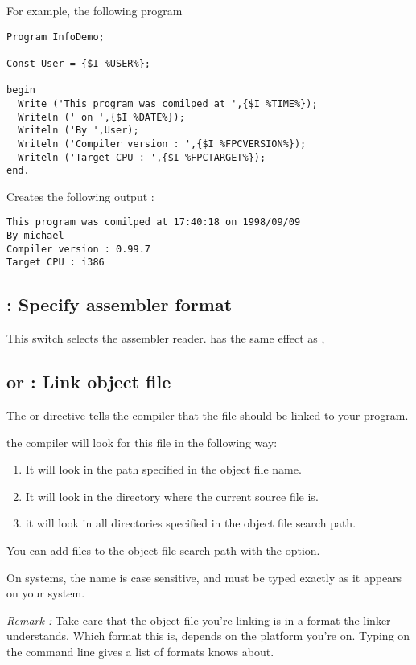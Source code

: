 \documentclass{report}
\begin{document}
For example, the following program
\begin{verbatim}
Program InfoDemo;

Const User = {$I %USER%};
       
begin
  Write ('This program was comilped at ',{$I %TIME%});
  Writeln (' on ',{$I %DATE%});
  Writeln ('By ',User);
  Writeln ('Compiler version : ',{$I %FPCVERSION%});
  Writeln ('Target CPU : ',{$I %FPCTARGET%});
end.
\end{verbatim} 
Creates the following output :
\begin{verbatim}
This program was comilped at 17:40:18 on 1998/09/09
By michael
Compiler version : 0.99.7
Target CPU : i386
\end{verbatim}
\subsection{ : Specify assembler format}

This switch selects the assembler reader. 
has the same effect as , 

\subsection{ or  : Link object file}
The  or  directive 
tells the compiler that the file  should be linked to 
your program. 

the compiler will look for this file in the following way:

\begin{enumerate}
\item It will look in the path specified in the object file name. 
\item It will look in the directory where the current source file is.
\item it will look in all directories specified in the object file search path.
\end{enumerate}
You can add files to the object file search path with the 
option.

On \linux systems, the name is case sensitive, and must be typed 
exactly as it appears on your system.

{\em Remark :} Take care that the object file you're linking is in a
format the linker understands. Which format this is, depends on the platform
you're on. Typing  on the command line gives a list of formats
 knows about.
\end{document}

